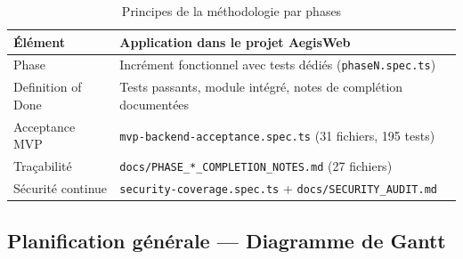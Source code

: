 \begin{table}[H]
\centering
\caption{Principes de la méthodologie par phases}
\label{tab:methodo}
\begin{tabularx}{\textwidth}{@{}lX@{}}
\toprule
\textbf{Élément}        & \textbf{Application dans le projet AegisWeb} \\
\midrule
\rowcolor{rowgray}
Phase                   & Incrément fonctionnel avec tests dédiés
                          (\texttt{phaseN.spec.ts}) \\
Definition of Done      & Tests passants, module intégré, notes de
                          complétion documentées \\
\rowcolor{rowgray}
Acceptance MVP          & \texttt{mvp-backend-acceptance.spec.ts}
                          (31 fichiers, 195 tests) \\
Traçabilité             & \texttt{docs/PHASE\_*\_COMPLETION\_NOTES.md}
                          (27 fichiers) \\
\rowcolor{rowgray}
Sécurité continue       & \texttt{security-coverage.spec.ts} +
                          \texttt{docs/SECURITY\_AUDIT.md} \\
\bottomrule
\end{tabularx}
\end{table}

\subsection{Planification générale — Diagramme de Gantt}

